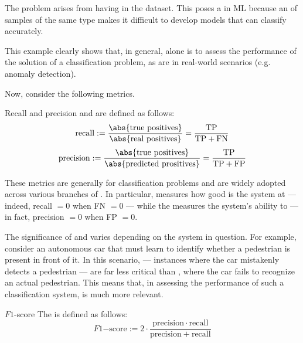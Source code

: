 \documentclass[a4paper, 12pt]{report}
\begin{document}
    The problem arises from having   in the dataset. This poses a  in ML because an  of samples of the same type makes it difficult to develop models that can classify accurately.

    This example clearly shows that, in general,  alone is  to assess the performance of the solution of a classification problem, as  are  in real-world scenarios (e.g. anomaly detection).

    Now, consider the following metrics.

    \begin{frameddefn}{Recall and precision}
         and  are defined as follows: $$\mathrm{recall} := \dfrac{\abs{\mathrm{true \ positives}}}{\abs{\mathrm{real \ positives}}} = \dfrac{\mathrm{TP}}{\mathrm{TP} + \mathrm{FN}}$$ $$\mathrm{precision} := \dfrac{\abs{\mathrm{true \ positives}}}{\abs{\mathrm{predicted \ prositives}}} = \dfrac{\mathrm{TP}}{\mathrm{TP} + \mathrm{FP}}$$
    \end{frameddefn}

    These metrics are generally  for classification problems and are widely adopted across various branches of . In particular,  measures how good is the system at  --- indeed, recall $= 0$ when FN $= 0$ --- while the  measures the system's ability to  --- in fact, precision $= 0$ when FP $= 0$.

    The significance of  and  varies depending on the system in question. For example, consider an autonomous car that must learn to identify whether a pedestrian is present in front of it. In this scenario,  --- instances where the car mistakenly detects a pedestrian --- are far less critical than , where the car fails to recognize an actual pedestrian. This means that, in assessing the performance of such a classification system,  is much more relevant.

    \begin{frameddefn}{$F1$-score}
        The  is defined as follows: $$F1\mathrm{-score} := 2 \cdot \dfrac{\mathrm{precision} \cdot \mathrm{recall}}{\mathrm{precision} + \mathrm{recall}}$$
    \end{frameddefn}
\end{document}
